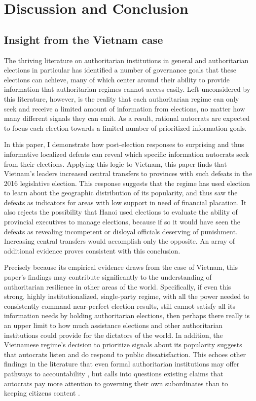 \documentclass[12pt]{article}
\newcommand{\1}{\mathbbm{1}}
\begin{document}
\section{Discussion and Conclusion}

\subsection{Insight from the Vietnam case}

The thriving literature on authoritarian institutions in general and authoritarian elections in particular has identified a number of governance goals that these elections can achieve, many of which center around their ability to provide information that authoritarian regimes cannot access easily. Left unconsidered by this literature, however, is the reality that each authoritarian regime can only seek and receive a limited amount of information from elections, no matter how many different signals they can emit. As a result, rational autocrats are expected to focus each election towards a limited number of prioritized information goals.

In this paper, I demonstrate how post-election responses to surprising and thus informative localized defeats can reveal which specific information autocrats seek from their elections. Applying this logic to Vietnam, this paper finds that Vietnam's leaders increased central transfers to provinces with such defeats in the 2016 legislative election. This response suggests that the regime has used election to learn about the geographic distribution of its popularity, and thus saw the defeats as indicators for areas with low support in need of financial placation. It also rejects the possibility that Hanoi used elections to evaluate the ability of provincial executives to manage elections, because if so it would have seen the defeats as revealing incompetent or disloyal officials deserving of punishment. Increasing central transfers would accomplish only the opposite. An array of additional evidence proves consistent with this conclusion.

Precisely because its empirical evidence draws from the case of Vietnam, this paper's findings may contribute significantly to the understanding of authoritarian resilience in other areas of the world. Specifically, if even this strong, highly institutionalized, single-party regime, with all the power needed to consistently command near-perfect election results, still cannot satisfy all its information needs by holding authoritarian elections, then perhaps there really is an upper limit to how much assistance elections and other authoritarian institutions could provide for the dictators of the world. In addition, the Vietnamese regime's decision to prioritize signals about its popularity suggests that autocrats listen and do respond to public dissatisfaction. This echoes other findings in the literature that even formal authoritarian institutions may offer pathways to accountability \citep[e.g.][]{Miller2015}, but calls into questions existing claims that autocrats pay more attention to governing their own subordinates than to keeping citizens content \citep[e.g.][]{Svolik2012}.
\end{document}

